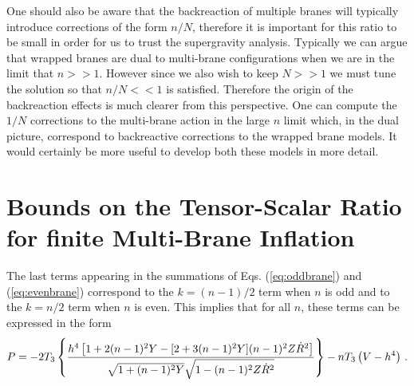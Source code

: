One should also be aware that the backreaction of multiple branes will
typically introduce corrections of the form $n/N$, therefore it is important
for this ratio to be small in order for us to trust the supergravity analysis.
Typically we can argue that wrapped branes are dual to multi-brane configurations when
we are in the limit that $n>>1$. However since we also wish to keep $N>>1$ we must tune
the solution so that $n/N<<1$ is satisfied. Therefore the origin of the backreaction effects
is much clearer from this perspective. One can compute the $1/N$ corrections to the multi-brane
action in the large $n$ limit \cite{Ward:2007gs} which, in the dual picture, correspond to
backreactive corrections
to the wrapped brane models. It would certainly be more useful to develop both these models in more
detail.


% 
% 
\section{Bounds on the Tensor-Scalar Ratio for finite Multi-Brane 
Inflation} 
\label{sec:multibounds-multi}


The last terms appearing in the summations of Eqs. (\ref{eq:oddbrane}) 
and (\ref{eq:evenbrane}) correspond  to the $k=(n-1)/2$ 
term when $n$ is odd and to the $k=n/2$ term when $n$ is even. This 
implies that for all $n$, these terms can be expressed in the form 
% 
\begin{equation}
\label{eq:unifiedgenP-multi}
P = -2T_3 \left\{ \frac{h^4 \left[ 1+2(n-1)^2Y
- [ 2+3(n-1)^2Y] (n-1)^2Z\dot{R}^2  \right]}{\sqrt{1+(n-1)^2Y}
\sqrt{1-(n-1)^2Z\dot{R}^2}} 
 \right\} -n T_3 \left( V -h^4 \right) \,.
\end{equation}
% 


